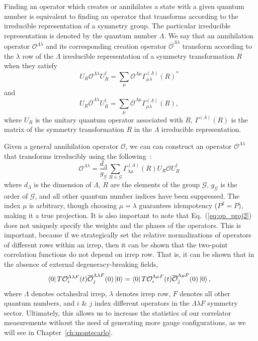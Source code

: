     Finding an operator which creates or annihilates a state with a given quantum number is equivalent to finding an operator that transforms according to the irreducible representation of a symmetry group. The particular irreducible representation is denoted by the quantum number $\Lambda$. We say that an annihilation operator $\mathcal O^{\Lambda \lambda}$ and its 
    corresponding creation operator $\overline{\mathcal O}^{\Lambda \lambda}$ transform according to the $\lambda$ row of the $\Lambda$ irreducible representation of a symmetry transformation $R$ when they satisfy
    \begin{equation}
        U_R \mathcal O^{\Lambda \lambda} U_R^\dagger = \sum_\mu \mathcal O^{\Lambda \mu} \Gamma_{\mu \lambda}^{(\Lambda)}(R)^*
    \end{equation}
    and
    \begin{equation}
        U_R \overline{\mathcal O}^{\Lambda \lambda} U_R^\dagger = \sum_\mu \overline{\mathcal O}^{\Lambda \mu} \Gamma_{\mu \lambda}^{(\Lambda)}(R),
    \end{equation}
    where $U_R$ is the unitary quantum operator associated with $R$, $\Gamma^{(\Lambda)}(R)$ is the matrix of the symmetry transformation $R$ in the $\Lambda$ irreducible representation.

    Given a general annihilation operator $\mathcal O$, we can can construct an operator $\mathcal O^{\Lambda \lambda}$ that transforms irreducibly using the following~\cite{spectroscopy}:
    \begin{equation}\label{eq:op_proj2}
        \mathcal O^{\Lambda \lambda} = \frac{d_\Lambda}{g_\mathcal G}\sum_{R\in \mathcal G} \Gamma^{(\Lambda)}_{\lambda \mu}(R) U_R \mathcal O U_R^\dagger
    \end{equation}
    where $d_\Lambda$ is the dimension of $\Lambda$, $R$ are the elements of the group $\mathcal G$, $g_{\mathcal G}$ is the order of $\mathcal G$, and all other quantum number indices have been suppressed. The index $\mu$ is arbitrary, though choosing $\mu = \lambda$ guarantees idempotency ($P^2=P$), making it a true projection. It is also important to note that Eq.~(\ref{eq:op_proj2}) does not uniquely specify the weights and the phases of the operators. This is important, because if we strategically set the relative normalizations of operators of different rows within an irrep, then it can be shown that the two-point correlation functions do not depend on irrep row. That is, it can be shown that in the absence of external degeneracy-breaking fields,
    \begin{equation}
        \bra{0}T \mathcal{O}_i^{\Lambda \lambda F}(t) \overline{\mathcal O}_j^{\Lambda \lambda F}(0)\ket{0} = \bra{0}T \mathcal{O}_i^{\Lambda \mu F}(t) \overline{\mathcal O}_j^{\Lambda \mu F}(0)\ket{0},
    \end{equation}
    where $\Lambda$ denotes octahedral irrep, $\lambda$ denotes irrep row, $F$ denotes all other quantum numbers, and $i$ \& $j$ index different operators in the $\Lambda\lambda F$ symmetry sector. Ultimately, this allows us to increase the statistics of our correlator measurements without the need of generating more gauge configurations, as we will see in Chapter~\ref{ch:montecarlo}.
    
